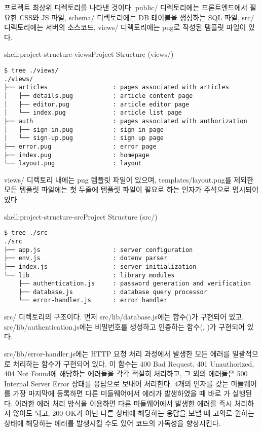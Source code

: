 \는 프로젝트 최상위 디렉토리를 나타낸 것이다. public/ 디렉토리에는 프론트엔드에서 필요한 CSS와 JS 파일, schema/ 디렉토리에는 DB 테이블을 생성하는 SQL 파일, src/ 디렉토리에는 서버의 소스코드, views/ 디렉토리에는 pug로 작성된 템플릿 파일이 있다.

\begin{shellenv}{shell:project-structure-views}{Project Structure (views/)}\begin{verbatim}
$ tree ./views/
./views/
├── articles                  : pages associated with articles
│   ├── details.pug           : article content page
│   ├── editor.pug            : article editor page
│   └── index.pug             : article list page
├── auth                      : pages associated with authorization
│   ├── sign-in.pug           : sign in page
│   └── sign-up.pug           : sign up page
├── error.pug                 : error page
├── index.pug                 : homepage
└── layout.pug                : layout
\end{verbatim}
\end{shellenv}

views/ 디렉토리 내에는 pug 템플릿 파일이 있으며, templates/layout.pug를 제외한 모든 템플릿 파일에는 첫 두줄에 템플릿 파일이 필요로 하는 인자가 주석으로 명시되어 있다.

\begin{shellenv}{shell:project-structure-src}{Project Structure (src/)}\begin{verbatim}
$ tree ./src
./src
├── app.js                    : server configuration
├── env.js                    : dotenv parser
├── index.js                  : server initialization
└── lib                       : library modules
    ├── authentication.js     : password generation and verification
    ├── database.js           : database query processor
    └── error-handler.js      : error handler
\end{verbatim}
\end{shellenv}

\는 src/ 디렉토리의 구조이다. 먼저 src/lib/database.js에는  함수()가 구현되어 있고, src/lib/authentication.js에는 비밀번호를 생성하고 인증하는 함수(, )가 구현되어 있다.

src/lib/error-handler.js에는 HTTP 요청 처리 과정에서 발생한 모든 에러를 일괄적으로 처리하는  함수가 구현되어 있다. 이 함수는 400 Bad Request, 401 Unauthorized, 404 Not Found에 해당하는 에러들을 각각 적절히 처리하고, 그 외의 에러들은 500 Internal Server Error 상태를 응답으로 보내어 처리한다. 4개의 인자를 갖는  미들웨어를 가장 마지막에 등록하면 다른 미들웨어에서 에러가 발생하였을 때 바로 가 실행된다. 이러한 에러 처리 방식을 이용하면 다른 미들웨어에서 발생한 에러를 즉시 처리하지 않아도 되고, 200 OK가 아닌 다른 상태에 해당하는 응답을 보낼 때 고의로 원하는 상태에 해당하는 에러를 발생시킬 수도 있어 코드의 가독성을 향상시킨다.

